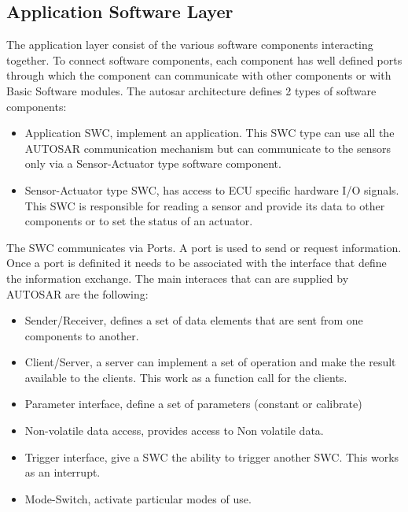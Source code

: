 \documentclass[../main.tex]{subfiles}
\begin{document}
\subsection{Application Software Layer}
The application layer consist of the various software components interacting together. 
To connect software components, each component has well defined ports through which the component can communicate with other components or with Basic Software modules. The autosar architecture defines 2 types of software components:
\begin{itemize}
    \item Application SWC, implement an application. This SWC type can use all the AUTOSAR communication mechanism but can communicate to the sensors only via a Sensor-Actuator type software component. 
    \item Sensor-Actuator type SWC, has access to ECU specific hardware I/O signals. This SWC is responsible for reading a sensor and provide its data to other components or to set the status of an actuator. 
\end{itemize}
The SWC communicates via Ports. A port is used to send or request information. Once a port is definited it needs to be associated with the interface that define the information exchange. The main interaces that can are supplied by AUTOSAR are the following:
\begin{itemize}
    \item Sender/Receiver, defines a set of data elements that are sent from one components to another. 
    \item Client/Server, a server can implement a set of operation and make the result available to the clients. This work as a function call for the clients. 
    \item Parameter interface, define a set of parameters (constant or calibrate)
    \item Non-volatile data access, provides access to Non volatile data. 
    \item Trigger interface, give a SWC the ability to trigger another SWC. This works as an interrupt. 
    \item Mode-Switch, activate particular modes of use. 
\end{itemize}
\end{document}

